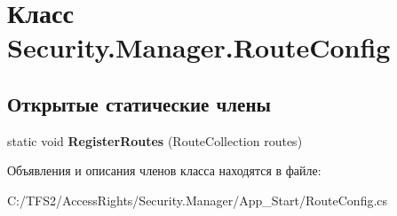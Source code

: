 \hypertarget{class_security_1_1_manager_1_1_route_config}{}\section{Класс Security.\+Manager.\+Route\+Config}
\label{class_security_1_1_manager_1_1_route_config}
\subsection*{Открытые статические члены}
\begin{DoxyCompactItemize}
\item 
\mbox{\label{class_security_1_1_manager_1_1_route_config_a0ece3cc4df4c2761076f1f1c94bcd0c4}} 
static void {\bfseries Register\+Routes} (Route\+Collection routes)
\end{DoxyCompactItemize}


Объявления и описания членов класса находятся в файле\+:\begin{DoxyCompactItemize}
\item 
C\+:/\+T\+F\+S2/\+Access\+Rights/\+Security.\+Manager/\+App\+\_\+\+Start/Route\+Config.\+cs\end{DoxyCompactItemize}
